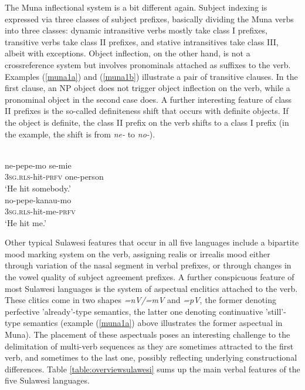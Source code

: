 The Muna inflectional system is a bit different again. Subject indexing is expressed via three classes of subject prefixes, basically dividing the Muna verbs into three classes: dynamic intransitive verbs mostly take class I prefixes, transitive verbs take class II prefixes, and stative intransitives take class III, albeit with exceptions. Object inflection, on the other hand, is not a crossreference system but involves pronominals attached as suffixes to the verb. Examples (\ref{muna1a}) and (\ref{muna1b}) illustrate a pair of transitive clauses. In the first clause, an NP object does not trigger object inflection on the verb, while a pronominal object in the second case does. A further interesting feature of class II prefixes is the so-called definiteness shift that occurs with definite objects. If the object is definite, the class II prefix on the verb shifts to a class I prefix (in the example, the shift is from \textit{ne-} to \textit{no-}).

\ea 
{}\\
\ea \label{muna1a}
\gll ne-pepe-mo se-mie \\
\textsc{3}\textsc{sg}.\textsc{rls}-hit-\textsc{prfv} one-person \\
\glft `He hit somebody.' \\ 
\ex \label{muna1b}
\gll no-pepe-kanau-mo \\ 
\textsc{3}\textsc{sg}.\textsc{rls}-hit-me-\textsc{prfv} \\
\glft `He hit me.' \\ 
\z
\z

Other typical Sulawesi features that occur in all five languages include a bipartite mood marking system on the verb, assigning realis or irrealis mood either through variation of the nasal segment in verbal prefixes, or through changes in the vowel quality of subject agreement prefixes. A further conspicuous feature of most Sulawesi languages is the system of aspectual enclitics attached to the verb. These clitics come in two shapes \textit{=nV/=mV} and \textit{=pV}, the former denoting perfective 'already'-type semantics, the latter one denoting continuative 'still'-type semantics (example (\ref{muna1a}) above illustrates the former aspectual in Muna). The placement of these aspectuals poses an interesting challenge to the delimitation of multi-verb sequences as they are sometimes attracted to the first verb, and sometimes to the last one, possibly reflecting underlying constructional differences. Table \ref{table:overviewsulawesi} sums up the main verbal features of the five Sulawesi languages.

